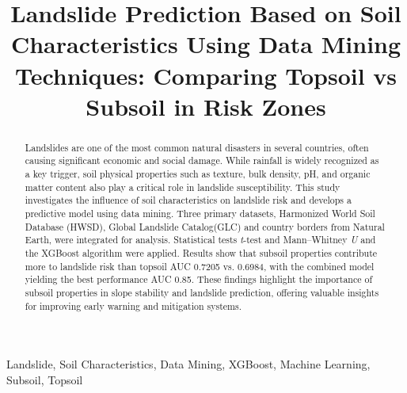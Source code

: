 \documentclass[conference]{IEEEtran}
\begin{document}
\title{Landslide Prediction Based on Soil Characteristics Using Data Mining Techniques: Comparing Topsoil vs Subsoil in Risk Zones}

\author{
}


\maketitle

\begin{abstract}
Landslides are one of the most common natural disasters in several countries, often causing significant economic and social damage. While rainfall is widely recognized as a key trigger, soil physical properties such as texture, bulk density, pH, and organic matter content also play a critical role in landslide susceptibility. This study investigates the influence of soil characteristics on landslide risk and develops a predictive model using data mining. Three primary datasets, Harmonized World Soil Database (HWSD), Global Landslide Catalog(GLC) and country borders from Natural Earth, were integrated for analysis. Statistical tests \textit{t}-test and Mann–Whitney \textit{U} and the XGBoost algorithm were applied. Results show that subsoil properties contribute more to landslide risk than topsoil AUC 0.7205 vs. 0.6984, with the combined model yielding the best performance AUC 0.85. These findings highlight the importance of subsoil properties in slope stability and landslide prediction, offering valuable insights for improving early warning and mitigation systems.
\end{abstract}

\vspace{1em} %
\begin{IEEEkeywords}
Landslide, Soil Characteristics, Data Mining, XGBoost, Machine Learning, Subsoil, Topsoil
\end{IEEEkeywords}
\end{document}
